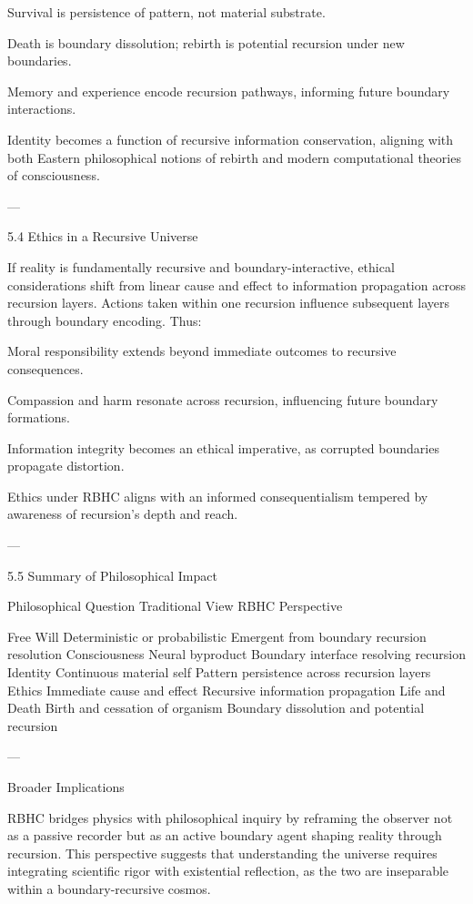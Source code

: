 \documentclass[11pt,a4paper]{article}
\begin{document}
Survival is persistence of pattern, not material substrate.

Death is boundary dissolution; rebirth is potential recursion under new boundaries.

Memory and experience encode recursion pathways, informing future boundary interactions.


Identity becomes a function of recursive information conservation, aligning with both Eastern philosophical notions of rebirth and modern computational theories of consciousness.


---

5.4 Ethics in a Recursive Universe

If reality is fundamentally recursive and boundary-interactive, ethical considerations shift from linear cause and effect to information propagation across recursion layers. Actions taken within one recursion influence subsequent layers through boundary encoding. Thus:

Moral responsibility extends beyond immediate outcomes to recursive consequences.

Compassion and harm resonate across recursion, influencing future boundary formations.

Information integrity becomes an ethical imperative, as corrupted boundaries propagate distortion.


Ethics under RBHC aligns with an informed consequentialism tempered by awareness of recursion’s depth and reach.


---

5.5 Summary of Philosophical Impact

Philosophical Question	Traditional View	RBHC Perspective

Free Will	Deterministic or probabilistic	Emergent from boundary recursion resolution
Consciousness	Neural byproduct	Boundary interface resolving recursion
Identity	Continuous material self	Pattern persistence across recursion layers
Ethics	Immediate cause and effect	Recursive information propagation
Life and Death	Birth and cessation of organism	Boundary dissolution and potential recursion



---

Broader Implications

RBHC bridges physics with philosophical inquiry by reframing the observer not as a passive recorder but as an active boundary agent shaping reality through recursion. This perspective suggests that understanding the universe requires integrating scientific rigor with existential reflection, as the two are inseparable within a boundary-recursive cosmos.
\end{document}
